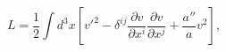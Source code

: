 \begin{equation}\label{eq:action}
  L=\frac{1}{2}\int d^3x\left[v'^2-\delta^{ij}
        \frac{\partial v}{\partial x^i}\frac{\partial v}{\partial x^j}
        +\frac{a''}{a}v^2\right],
\end{equation}

